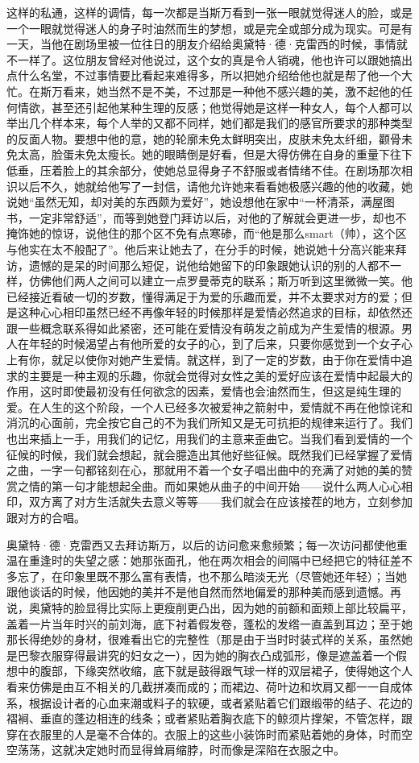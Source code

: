 \par 这样的私通，这样的调情，每一次都是当斯万看到一张一眼就觉得迷人的脸，或是一个一眼就觉得迷人的身子时油然而生的梦想，或是完全或部分成为现实。可是有一天，当他在剧场里被一位往日的朋友介绍给奥黛特·德·克雷西的时候，事情就不一样了。这位朋友曾经对他说过，这个女的真是令人销魂，他也许可以跟她搞出点什么名堂，不过事情要比看起来难得多，所以把她介绍给他也就是帮了他一个大忙。在斯万看来，她当然不是不美，不过那是一种他不感兴趣的美，激不起他的任何情欲，甚至还引起他某种生理的反感；他觉得她是这样一种女人，每个人都可以举出几个样本来，每个人举的又都不同样，她们都是我们的感官所要求的那种类型的反面人物。要想中他的意，她的轮廓未免太鲜明突出，皮肤未免太纤细，颧骨未免太高，脸蛋未免太瘦长。她的眼睛倒是好看，但是大得仿佛在自身的重量下往下低垂，压着脸上的其余部分，使她总显得身子不舒服或者情绪不佳。在剧场那次相识以后不久，她就给他写了一封信，请他允许她来看看她极感兴趣的他的收藏，她说她“虽然无知，却对美的东西颇为爱好”，她设想他在家中“一杯清茶，满屋图书，一定非常舒适”，而等到她登门拜访以后，对他的了解就会更进一步，却也不掩饰她的惊讶，说他住的那个区不免有点寒碜，而“他是那么smart（帅），这个区与他实在太不般配了”。他后来让她去了，在分手的时候，她说她十分高兴能来拜访，遗憾的是呆的时间那么短促，说他给她留下的印象跟她认识的别的人都不一样，仿佛他们两人之间可以建立一点罗曼蒂克的联系；斯万听到这里微微一笑。他已经接近看破一切的岁数，懂得满足于为爱的乐趣而爱，并不太要求对方的爱；但是这种心心相印虽然已经不再像年轻的时候那样是爱情必然追求的目标，却依然还跟一些概念联系得如此紧密，还可能在爱情没有萌发之前成为产生爱情的根源。男人在年轻的时候渴望占有他所爱的女子的心，到了后来，只要你感觉到一个女子心上有你，就足以使你对她产生爱情。就这样，到了一定的岁数，由于你在爱情中追求的主要是一种主观的乐趣，你就会觉得对女性之美的爱好应该在爱情中起最大的作用，这时即使最初没有任何欲念的因素，爱情也会油然而生，但这是纯生理的爱。在人生的这个阶段，一个人已经多次被爱神之箭射中，爱情就不再在他惊诧和消沉的心面前，完全按它自己的不为我们所知又是无可抗拒的规律来运行了。我们也出来插上一手，用我们的记忆，用我们的主意来歪曲它。当我们看到爱情的一个征候的时候，我们就会想起，就会臆造出其他好些征候。既然我们已经掌握了爱情之曲，一字一句都铭刻在心，那就用不着一个女子唱出曲中的充满了对她的美的赞赏之情的第一句才能想起全曲。而如果她从曲子的中间开始——说什么两人心心相印，双方离了对方生活就失去意义等等——我们就会在应该接茬的地方，立刻参加跟对方的合唱。
\par 奥黛特·德·克雷西又去拜访斯万，以后的访问愈来愈频繁；每一次访问都使他重温在重逢时的失望之感：她那张面孔，他在两次相会的间隔中已经把它的特征差不多忘了，在印象里既不那么富有表情，也不那么暗淡无光（尽管她还年轻）；当她跟他谈话的时候，他因她的美并不是他自然而然地偏爱的那种美而感到遗憾。再说，奥黛特的脸显得比实际上更瘦削更凸出，因为她的前额和面颊上部比较扁平，盖着一片当年时兴的前刘海，底下衬着假发卷，蓬松的发绺一直盖到耳边；至于她那长得绝妙的身材，很难看出它的完整性（那是由于当时时装式样的关系，虽然她是巴黎衣服穿得最讲究的妇女之一），因为她的胸衣凸成弧形，像是遮盖着一个假想中的腹部，下缘突然收缩，底下就是鼓得跟气球一样的双层裙子，使得她这个人看来仿佛是由互不相关的几截拼凑而成的；而裙边、荷叶边和坎肩又都一一自成体系，根据设计者的心血来潮或料子的软硬，或者紧贴着它们跟缎带的结子、花边的褶裥、垂直的蓬边相连的线条；或者紧贴着胸衣底下的鲸须片撑架，不管怎样，跟穿在衣服里的人是毫不合体的。衣服上的这些小装饰时而紧贴着她的身体，时而空空荡荡，这就决定她时而显得耸肩缩脖，时而像是深陷在衣服之中。
